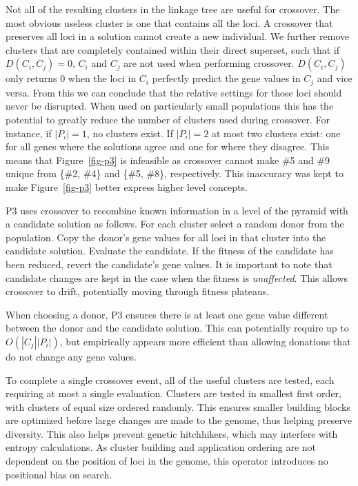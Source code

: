 \documentclass{sig-alternate}
\begin{document}
Not all of  the resulting clusters in the linkage  tree are useful for
crossover.  The most obvious useless  cluster is one that contains all
the loci.   A crossover that preserves  all loci in  a solution cannot
create  a  new  individual.   We  further  remove  clusters  that  are
completely  contained   within their direct superset,   such  that  if
$D(C_i,C_j) = 0$, $C_i$  and  $C_j$ are  not used  when  performing
crossover.   $D(C_i,C_j)$ only  returns  $0$ when  the  loci in  $C_i$
perfectly predict the gene values in $C_j$ and vice versa. From this we can
conclude  that  the relative settings  for  those  loci  should  never  be
disrupted.  When  used on particularly small populations  this has the
potential  to  greatly  reduce  the  number of  clusters  used  during
crossover.  For  instance, if  $|P_i| = 1$,  no clusters exist. If
$|P_i| =  2$ at most two clusters  exist: one for all  genes where the
solutions agree and one for where they disagree.
This means that Figure~\ref{fig-p3} is infeasible as crossover
cannot make \#5 and \#9 unique from \{\#2, \#4\} and \{\#5, \#8\}, respectively.
This inaccuracy was kept to make Figure~\ref{fig-p3} better express
higher level concepts.

P3 uses crossover to recombine known information in a level of the
pyramid with a candidate solution as follows.  For
each cluster select a random donor from the population.  Copy the
donor's gene values for all loci in that cluster into the candidate
solution.  Evaluate the candidate.  If the fitness of the candidate
has been reduced, revert the candidate's gene values.  It is important
to note that candidate changes are kept in the case when the fitness
is \emph{unaffected}.  This allows crossover to drift, potentially
moving through fitness plateaus.

When choosing a donor, P3 ensures there is at least one gene value
different between the donor and the candidate solution.  This can
potentially require up to $O(|C_j||P_i|)$, but empirically appears
more efficient than allowing donations that do not change any gene
values.

To complete a single crossover event, all of the useful clusters are tested, each
requiring at most a single evaluation.  Clusters are tested in smallest first order,
with clusters of equal size ordered randomly.  This ensures smaller building blocks
are optimized before large changes are made to the genome, thus helping preserve
diversity.  This also helps prevent genetic hitchhikers, which may interfere with
entropy calculations.  As cluster building and application ordering are not dependent on
the position of loci in the genome, this operator introduces no positional bias on search.
\end{document}
